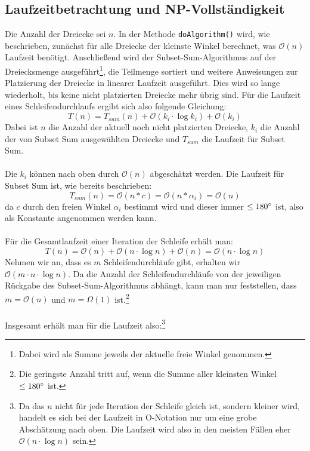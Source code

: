 \documentclass[a4paper, notitlepage, 12pt]{scrartcl}
\begin{document}
 \subsection{Laufzeitbetrachtung und NP-Vollständigkeit}
 Die Anzahl der Dreiecke sei $n$. In der Methode \texttt{doAlgorithm()} wird, wie beschrieben, zunächst für alle Dreiecke der kleinste Winkel berechnet, was $\mathcal{O}(n)$ Laufzeit benötigt. Anschließend wird der Subset-Sum-Algorithmus auf der Dreiecksmenge ausgeführt\footnote{Dabei wird als Summe jeweils der aktuelle freie Winkel genommen.}, die Teilmenge sortiert und weitere Anweisungen zur Platzierung der Dreiecke in linearer Laufzeit ausgeführt. Dies wird so lange wiederholt, bis keine nicht platzierten Dreiecke mehr übrig sind. Für die Laufzeit eines Schleifendurchlaufs ergibt sich also folgende Gleichung:
 \begin{equation}
 T(n) = T_{sum}(n) + \mathcal{O}(k_i \cdot \log k_i) + \mathcal{O}(k_i)
 \end{equation}
Dabei ist $n$ die Anzahl der aktuell noch nicht platzierten Dreiecke, $k_i$ die Anzahl der von Subset Sum ausgewählten Dreiecke und $T_{sum}$ die Laufzeit für Subset Sum. \\ \\
Die $k_i$ können nach oben durch $\mathcal{O}(n)$ abgeschätzt werden. Die Laufzeit für Subset Sum ist, wie bereits beschrieben:
\begin{equation}
T_{sum}(n) = \mathcal{O}(n * c) = \mathcal{O}(n * \alpha_i) = \mathcal{O}(n)
\end{equation}
da $c$ durch den freien Winkel $\alpha_i$ bestimmt wird und dieser immer $\leq 180\degree$ ist, also als Konstante angenommen werden kann. \\ \\
Für die Gesamtlaufzeit einer Iteration der Schleife erhält man:
 \begin{equation}
T(n) = \mathcal{O}(n) + \mathcal{O}(n \cdot \log n) + \mathcal{O}(n) = \mathcal{O}(n \cdot \log n)
\end{equation}
Nehmen wir an, dass es $m$ Schleifendurchläufe gibt, erhalten wir $\mathcal{O}(m \cdot n \cdot \log n)$. Da die Anzahl der Schleifendurchläufe von der jeweiligen Rückgabe des Subset-Sum-Algorithmus abhängt, kann man nur feststellen, dass $m = \mathcal{O}(n)$ und $m = \Omega(1)$ ist.\footnote{Die geringste Anzahl tritt auf, wenn die Summe aller kleinsten Winkel $\leq 180\degree$ ist.} \\ \\
Insgesamt erhält man für die Laufzeit also:\footnote{Da das $n$ nicht für jede Iteration der Schleife gleich ist, sondern kleiner wird, handelt es sich bei der Laufzeit in O-Notation nur um eine grobe Abschätzung nach oben. Die Laufzeit wird also in den meisten Fällen eher $\mathcal{O}(n \cdot \log n)$ sein.}
\end{document}
